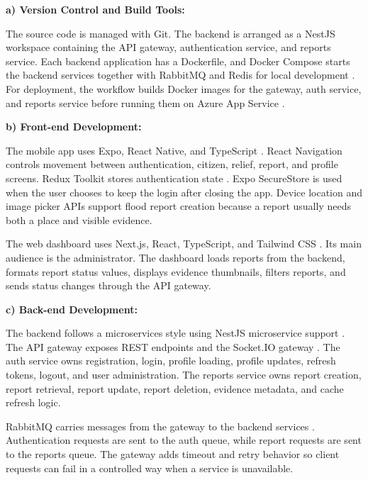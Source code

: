 \vspace{1em}
\noindent
\textbf{a) Version Control and Build Tools:}

The source code is managed with Git. The backend is arranged as a NestJS workspace containing the API gateway, authentication service, and reports service. Each backend application has a Dockerfile, and Docker Compose starts the backend services together with RabbitMQ and Redis for local development \cite{dockerComposeDocs}. For deployment, the workflow builds Docker images for the gateway, auth service, and reports service before running them on Azure App Service \cite{azureAppServiceContainersDocs}.

\vspace{1em}
\noindent
\textbf{b) Front-end Development:}

The mobile app uses Expo, React Native, and TypeScript \cite{expoDocs,reactNativeDocs,typescriptDocs}. React Navigation controls movement between authentication, citizen, relief, report, and profile screens. Redux Toolkit stores authentication state \cite{reduxToolkitDocs}. Expo SecureStore is used when the user chooses to keep the login after closing the app. Device location and image picker APIs support flood report creation because a report usually needs both a place and visible evidence.

The web dashboard uses Next.js, React, TypeScript, and Tailwind CSS \cite{nextjsDocs,reactDocs,typescriptDocs,tailwindDocs}. Its main audience is the administrator. The dashboard loads reports from the backend, formats report status values, displays evidence thumbnails, filters reports, and sends status changes through the API gateway.

\vspace{1em}
\noindent
\textbf{c) Back-end Development:}

The backend follows a microservices style using NestJS microservice support \cite{nestjsMicroservicesDocs}. The API gateway exposes REST endpoints and the Socket.IO gateway \cite{socketioDocs}. The auth service owns registration, login, profile loading, profile updates, refresh tokens, logout, and user administration. The reports service owns report creation, report retrieval, report update, report deletion, evidence metadata, and cache refresh logic.

RabbitMQ carries messages from the gateway to the backend services \cite{rabbitmqConfirmsDocs}. Authentication requests are sent to the auth queue, while report requests are sent to the reports queue. The gateway adds timeout and retry behavior so client requests can fail in a controlled way when a service is unavailable.

